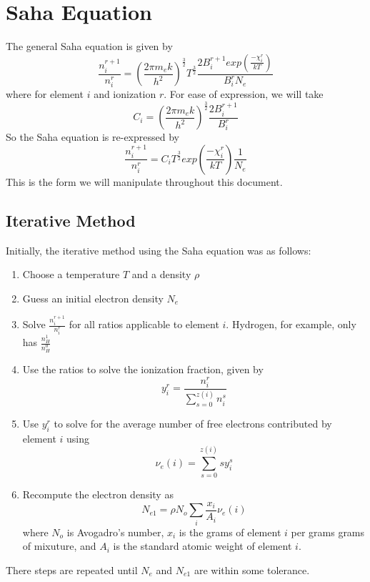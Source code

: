 \documentclass{article}
\begin{document}
	
	\newpage

	\section{Saha Equation}
		The general Saha equation is given by
		\begin{equation} \label{eq:gen_saha}
			\frac{n^{r+1}_i}{n^r_i} = 
				\left( \frac{2 \pi m_e k}{h^2} \right)^\frac{3}{2} T^\frac{3}{2} 
				\frac{2 B^{r+1}_i exp\left(\frac{-\chi^r_i}{kT}\right)}{B^r_i N_e}
		\end{equation}
		where for element $i$ and ionization $r$. For ease of expression, we will take
		\begin{equation} \label{eq:saha_constant}
			C_i =	\left( \frac{2 \pi m_e k}{h^2} \right)^\frac{3}{2}  
				\frac{2 B^{r+1}_i}{B^r_i}
		\end{equation}
		So the Saha equation is re-expressed by
		\begin{equation} \label{eq:revised_saha}
			\frac{n^{r+1}_i}{n^r_i} = C_i T^\frac{3}{2} 
				exp\left(\frac{-\chi^r_i}{kT}\right) \frac{1}{N_e}
		\end{equation}
		This is the form we will manipulate throughout this document.

		\subsection{Iterative Method}
			Initially, the iterative method using the Saha equation was as follows:
			\begin{enumerate}
				\item Choose a temperature $T$ and a density $\rho$
				\item Guess an initial electron density $N_e$
				\item Solve $\frac{n^{r+1}_i}{n^r_i}$ for all ratios applicable to 
					element $i$. Hydrogen, for example, only has $\frac{n^{1}_H}{n^0_H}$
				\item Use the ratios to solve the ionization fraction, given by
					\begin{equation} \label{eq:ion_frac}
						y^r_i = \frac{n^r_i}{\displaystyle\sum^{z(i)}_{s=0}{n^s_i}}
					\end{equation}
				\item Use $y^r_i$ to solve for the average number of free electrons contributed 
					by element $i$ using
					\begin{equation} \label{eq:avg_elec}
						\nu_e(i) = \displaystyle\sum_{s=0}^{z(i)}{s y^s_i}
					\end{equation}
				\item Recompute the electron density as
					\begin{equation} \label{eq:new_Ne}
						N_{e1} = \rho N_o \displaystyle\sum_{i}{\frac{x_i}{A_i} \nu_e(i) } 
					\end{equation}
					where $N_o$ is Avogadro's number, $x_i$ is the grams of element $i$ per grams
					grams of mixuture, and $A_i$ is the standard atomic weight of element $i$.
			\end{enumerate}
			There steps are repeated until $N_e$ and $N_{e1}$ are within some tolerance.
			
\end{document}
